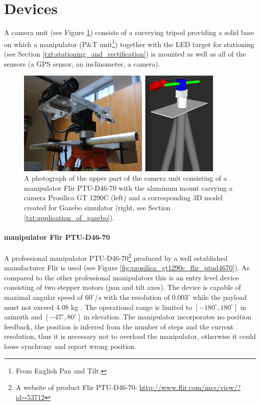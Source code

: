 \section{Devices} \label{txt:devices}

A camera unit (see Figure \ref{fig:camera_unit_photo_model}) consists of a surveying tripod providing a solid base on which a manipulator (P\&T unit\footnote{From English Pan and Tilt.}) together with the LED target for stationing (see Section \ref{txt:stationing_and_rectification}) is mounted as well as all of the sensors (a GPS sensor, an inclinometer, a camera).

\begin{figure}[htb]
	\centering
	\includegraphics[width=10cm]{fig/camera_unit_photo_model.jpg}
	\caption{A photograph of the upper part of the camera unit consisting of a manipulator Flir PTU-D46-70 with the aluminum mount carrying a camera Prosilica GT 1290C (left) and a corresponding 3D model created for Gazebo simulator (right, see Section \ref{txt:application_of_gazebo}).}
	\label{fig:camera_unit_photo_model}
\end{figure}

\paragraph{manipulator Flir PTU-D46-70} A professional manipulator PTU-D46-70\footnote{A website of product Flir PTU-D46-70: \url{http://www.flir.com/mcs/view/?id=53712}} produced by a well established manufacturer Flir is used (see Figure \ref{fig:prosilica_gt1290c_flir_ptud4670}). As compared to the other professional manipulators this is an entry level device consisting of two stepper motors (pan and tilt axes). The device is capable of maximal angular speed of $60^{\circ}/s$ with the resolution of $0.003^{\circ}$ while the payload must not exceed 4.08 kg \cite{Flir_ptud4670}. The operational range is limited to $[-180^{\circ}, 180^{\circ}]$ in azimuth and $[-47^{\circ}, 80^{\circ}]$ in elevation. The manipulator incorporates no position feedback, the position is inferred from the number of steps and the current resolution, thus it is necessary not to overload the manipulator, otherwise it could loose synchrony and report wrong position. 

